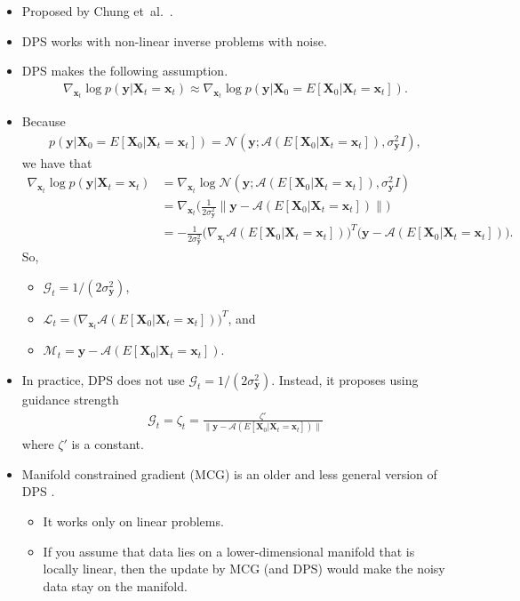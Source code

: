 \documentclass[10pt]{article}
\newcommand{\ve}[1]{\mathbf{#1}}
\newcommand{\etal}{{et~al.}}
\newcommand{\mcal}[1]{\mathcal{#1}}
\begin{document}
\begin{itemize}
  \item Proposed by Chung \etal~\cite{Chung:DPS:2024}.
  
  \item DPS works with non-linear inverse problems with noise.
  
  \item DPS makes the following assumption.
  \begin{align*}
    \nabla_{\ve{x}_t} \log p(\ve{y}|\ve{X}_t = \ve{x}_t) \approx \nabla_{\ve{x}_t} \log p(\ve{y}|\ve{X}_0 = E[\ve{X}_0|\ve{X}_t = \ve{x}_t]).
  \end{align*}

  \item Because
  \begin{align*}
    p(\ve{y}|\ve{X}_0 = E[\ve{X}_0|\ve{X}_t = \ve{x}_t]) = \mcal{N}(\ve{y}; \mcal{A}(E[\ve{X}_0|\ve{X}_t = \ve{x}_t]), \sigma_{\ve{y}}^2 I),
  \end{align*}
  we have that
  \begin{align*}
    \nabla_{\ve{x}_t} \log p(\ve{y}|\ve{X}_t = \ve{x}_t) 
    &= \nabla_{\ve{x}_t} \log \mcal{N}(\ve{y}; \mcal{A}(E[\ve{X}_0|\ve{X}_t = \ve{x}_t]), \sigma_{\ve{y}}^2 I) \\
    &= \nabla_{\ve{x}_t} \bigg( \frac{1}{2 \sigma_{\ve{y}}^2} \| \ve{y} - \mcal{A}(E[\ve{X}_0|\ve{X}_t = \ve{x}_t]) \|  \bigg) \\
    &= - \frac{1}{2\sigma_{\ve{y}}^2} \big( \nabla_{\ve{x}_t} \mcal{A}(E[\ve{X}_0|\ve{X}_t = \ve{x}_t]) \big)^T \big(  \ve{y} - \mcal{A}(E[\ve{X}_0|\ve{X}_t = \ve{x}_t])\big).
  \end{align*}
  So,
  \begin{itemize}
    \item $\mcal{G}_t = 1/(2\sigma^2_{\ve{y}})$,
    \item $\mcal{L}_t = \big( \nabla_{\ve{x}_t} \mcal{A}(E[\ve{X}_0|\ve{X}_t = \ve{x}_t]) \big)^T$, and
    \item $\mcal{M}_t = \ve{y} - \mcal{A}(E[\ve{X}_0|\ve{X}_t = \ve{x}_t])$.
  \end{itemize}

  \item In practice, DPS does not use $\mcal{G}_t = 1/(2\sigma^2_{\ve{y}})$. Instead, it proposes using guidance strength
  \begin{align*}
    \mcal{G}_t = \zeta_t = \frac{\zeta'}{\| \ve{y} - \mcal{A}(E[\ve{X}_0|\ve{X}_t = \ve{x}_t]) \|}
  \end{align*}
  where $\zeta'$ is a constant.

  \item Manifold constrained gradient (MCG) is an older and less general version of DPS \cite{Chung:DPS:2024}.
  \begin{itemize}
    \item It works only on linear problems.
    \item If you assume that data lies on a lower-dimensional manifold that is locally linear, then the update by MCG (and DPS) would make the noisy data stay on the manifold.
  \end{itemize}
\end{itemize}
\end{document}
